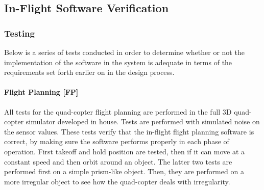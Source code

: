 \documentclass[10pt,letterpaper]{article}
\begin{document}
\newpage

\subsection{In-Flight Software Verification}

\subsubsection{Testing}
Below is a series of tests conducted in order to determine whether or not the implementation of the software in the system is adequate in terms of the requirements set forth earlier on in the design process.

\paragraph{Flight Planning [FP]}
All tests for the quad-copter flight planning are performed in the full 3D quad-copter simulator developed in house. Tests are performed with simulated noise on the sensor values. These tests verify that the in-flight flight planning software is correct, by making sure the software performs properly in each phase of operation. First takeoff and hold position are tested, then if it can move at a constant speed and then orbit around an object. The latter two tests are performed first on a simple prism-like object. Then, they are performed on a more irregular object to see how the quad-copter deals with irregularity.
\end{document}
